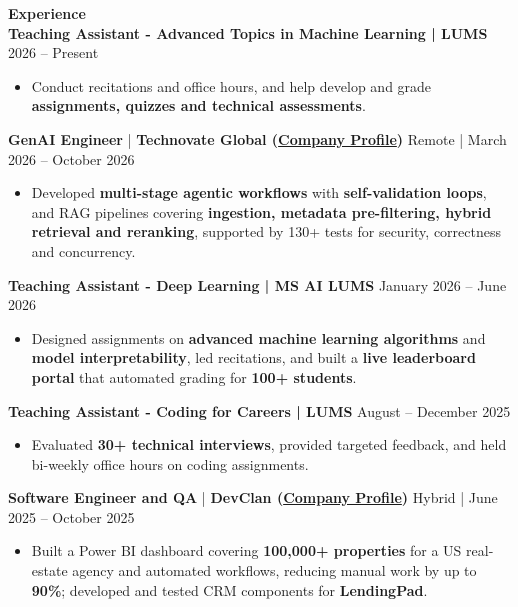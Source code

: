 \documentclass[11pt]{article}
\begin{document}
\newpage
{\large \textbf{Experience}}
\vspace{0.15cm}\\
\textbf{Teaching Assistant - Advanced Topics in Machine Learning | LUMS} \hfill 2026 – Present
\begin{itemize}[noitemsep, topsep=0pt, partopsep=0pt, parsep=0pt]
    \item Conduct recitations and office hours, and help develop and grade \textbf{assignments, quizzes and technical assessments}.
\end{itemize}
\textbf{GenAI Engineer} | \textbf{Technovate Global (\href{https://www.technovateglobal.com/}{Company Profile})} \hfill Remote | March 2026 – October 2026
\begin{itemize}[noitemsep, topsep=0pt, partopsep=0pt, parsep=0pt]
    \item Developed \textbf{multi-stage agentic workflows} with \textbf{self-validation loops}, and RAG pipelines covering \textbf{ingestion, metadata pre-filtering, hybrid retrieval and reranking}, supported by 130+ tests for security, correctness and concurrency.
\end{itemize}
\textbf{Teaching Assistant - Deep Learning | MS AI LUMS} \hfill January 2026 – June 2026
\begin{itemize}[noitemsep, topsep=0pt, partopsep=0pt, parsep=0pt]
    \item Designed assignments on \textbf{advanced machine learning algorithms} and \textbf{model interpretability}, led recitations, and built a \textbf{live leaderboard portal} that automated grading for \textbf{100+ students}.
\end{itemize}
\textbf{Teaching Assistant - Coding for Careers | LUMS} \hfill August – December 2025
\begin{itemize}[noitemsep, topsep=0pt, partopsep=0pt, parsep=0pt]
    \item Evaluated \textbf{30+ technical interviews}, provided targeted feedback, and held bi-weekly office hours on coding assignments.
\end{itemize}
\textbf{Software Engineer and QA} | \textbf{DevClan (\href{https://www.linkedin.com/company/devclan/}{Company Profile})} \hfill Hybrid | June 2025 – October 2025
\begin{itemize}[noitemsep, topsep=0pt, partopsep=0pt, parsep=0pt]
    \item Built a Power BI dashboard covering \textbf{100,000+ properties} for a US real-estate agency and automated workflows, reducing manual work by up to \textbf{90\%}; developed and tested CRM components for \textbf{LendingPad}.
\end{itemize}
\end{document}
